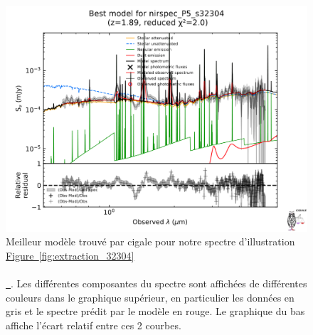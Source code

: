 \documentclass[12pt, a4paper]{article}
\newcommand*{\figref}[2][]{%
  \hyperref[{#2}]{%
    Figure~\ref*{#2}%
    \ifx\\#1\\%
    \else
      \,#1%
    \fi
  }%
}
\begin{document}
\begin{figure}[!h]
  \centering
  \includegraphics[width=\textwidth]{assets/nirspec_P5_s32304_best_model.png}
  \caption{Meilleur modèle trouvé par \gls{cigale} pour notre spectre d'illustration \figref{fig:extraction_32304}. Les différentes composantes du spectre sont affichées de différentes couleurs dans le graphique supérieur, en particulier les données en gris et le spectre prédit par le modèle en rouge. Le graphique du bas affiche l'écart relatif entre ces 2 courbes.}
  \label{fig:P5_s32304_best_model}
\end{figure}
\end{document}
